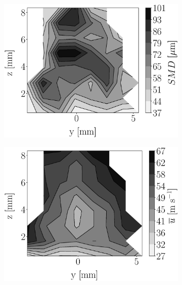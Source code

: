 

\begin{figure}[h!]
\flushleft
\begin{subfigure}[b]{0.22\textwidth}
	\centering
   \includegraphics[scale=0.17]{./part2_developments/figures_ch5_resolved_JICF/injectors_SLI/uG75_dx10_x10_SMD_map.eps}
\end{subfigure}
   \hspace{0.17in}
\begin{subfigure}[b]{0.22\textwidth}
	\centering
   \includegraphics[scale=0.17]{./part2_developments/figures_ch5_resolved_JICF/injectors_SLI/uG75_dx10_x10_ux_mean_map.eps}

\end{subfigure}
\end{figure}
